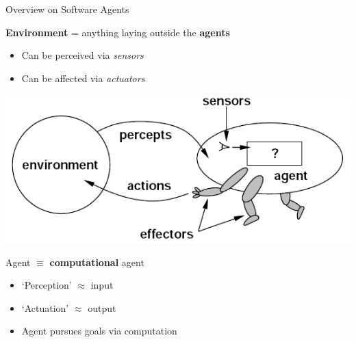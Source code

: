 \documentclass[presentation]{beamer}\mode<presentation>{\usetheme{AMSBolognaFC}}
\begin{document}
\begin{frame}{Overview on Software Agents}
    \begin{block}{\textbf{Environment} = anything laying outside the \textbf{agents}}
        \begin{itemize}
            \item
              Can be \alert{perceived} via \emph{sensors}
            \item
              Can be \alert{affected} via \emph{actuators}
        \end{itemize}
    \end{block}

    \begin{center}
        \includegraphics[width=.5\linewidth]{figures/agent-environment.png}
    \end{center}

    \begin{alertblock}{Agent $\equiv$ \textbf{computational} agent}
        \begin{multicols}{2}
            \begin{itemize}
                \item `Perception' $\approx$ \alert{input}
                \item `Actuation' $\approx$ \alert{output}
                \item Agent pursues \alert{goals} via \alert{computation}
            \end{itemize}
        \end{multicols}
    \end{alertblock}
\end{frame}
\end{document}
